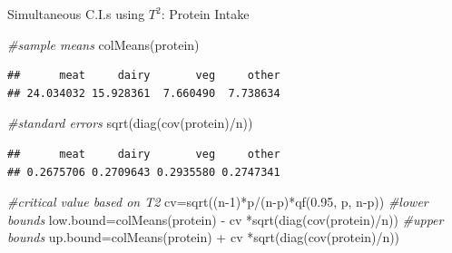 \documentclass[
  ignorenonframetext,
]{beamer}
\newenvironment{Shaded}{\begin{snugshade}}{\end{snugshade}}
\newcommand{\CommentTok}[1]{\textcolor[rgb]{0.56,0.35,0.01}{\textit{#1}}}
\newcommand{\DecValTok}[1]{\textcolor[rgb]{0.00,0.00,0.81}{#1}}
\newcommand{\FloatTok}[1]{\textcolor[rgb]{0.00,0.00,0.81}{#1}}
\newcommand{\FunctionTok}[1]{\textcolor[rgb]{0.00,0.00,0.00}{#1}}
\newcommand{\NormalTok}[1]{#1}
\newcommand{\OtherTok}[1]{\textcolor[rgb]{0.56,0.35,0.01}{#1}}
\newcommand{\SpecialCharTok}[1]{\textcolor[rgb]{0.00,0.00,0.00}{#1}}
\begin{document}
\begin{frame}[fragile]{Simultaneous C.I.s using \(T^2\): Protein Intake}
\protect\hypertarget{simultaneous-c.i.s-using-t2-protein-intake}{}
\tiny

\begin{Shaded}
\begin{Highlighting}[]
\CommentTok{\#sample means}
\FunctionTok{colMeans}\NormalTok{(protein)}
\end{Highlighting}
\end{Shaded}

\begin{verbatim}
##      meat     dairy       veg     other 
## 24.034032 15.928361  7.660490  7.738634
\end{verbatim}

\begin{Shaded}
\begin{Highlighting}[]
\CommentTok{\#standard errors}
\FunctionTok{sqrt}\NormalTok{(}\FunctionTok{diag}\NormalTok{(}\FunctionTok{cov}\NormalTok{(protein)}\SpecialCharTok{/}\NormalTok{n))}
\end{Highlighting}
\end{Shaded}

\begin{verbatim}
##      meat     dairy       veg     other 
## 0.2675706 0.2709643 0.2935580 0.2747341
\end{verbatim}

\begin{Shaded}
\begin{Highlighting}[]
\CommentTok{\#critical value based on T2}
\NormalTok{cv}\OtherTok{=}\FunctionTok{sqrt}\NormalTok{((n}\DecValTok{{-}1}\NormalTok{)}\SpecialCharTok{*}\NormalTok{p}\SpecialCharTok{/}\NormalTok{(n}\SpecialCharTok{{-}}\NormalTok{p)}\SpecialCharTok{*}\FunctionTok{qf}\NormalTok{(}\FloatTok{0.95}\NormalTok{, p, n}\SpecialCharTok{{-}}\NormalTok{p))}
\CommentTok{\#lower bounds}
\NormalTok{low.bound}\OtherTok{=}\FunctionTok{colMeans}\NormalTok{(protein) }\SpecialCharTok{{-}}\NormalTok{ cv }\SpecialCharTok{*}\FunctionTok{sqrt}\NormalTok{(}\FunctionTok{diag}\NormalTok{(}\FunctionTok{cov}\NormalTok{(protein)}\SpecialCharTok{/}\NormalTok{n))}
\CommentTok{\#upper bounds}
\NormalTok{up.bound}\OtherTok{=}\FunctionTok{colMeans}\NormalTok{(protein) }\SpecialCharTok{+}\NormalTok{ cv }\SpecialCharTok{*}\FunctionTok{sqrt}\NormalTok{(}\FunctionTok{diag}\NormalTok{(}\FunctionTok{cov}\NormalTok{(protein)}\SpecialCharTok{/}\NormalTok{n))}
\end{Highlighting}
\end{Shaded}

\normalsize
\end{frame}
\end{document}

